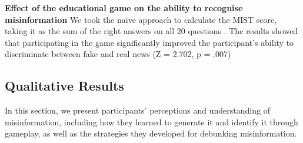 \textbf{Effect of the educational game on the ability to recognise misinformation
}
We took the naive approach to calculate the MIST score, taking it as the sum of the right answers on all 20 questions \cite{maertens2024misinformation}. The results showed that participating in the game significantly improved the participant's ability to discriminate between fake and real news (Z = 2.702, p = .007) 



\subsection{Qualitative Results}
In this section, we present participants' perceptions and understanding of misinformation, including how they learned to generate it and identify it through gameplay, as well as the strategies they developed for debunking misinformation. %



